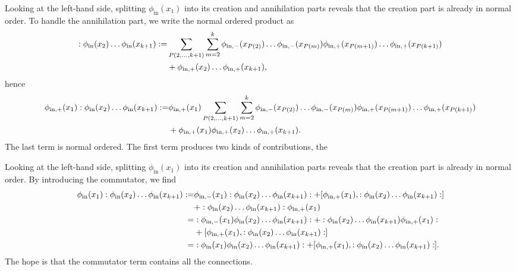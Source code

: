 Looking at the left-hand side, splitting $\phi_{\text{in}}(x_{1})$ into its creation and annihilation parts reveals that the creation part is already in normal order. To handle the annihilation part, we write the normal ordered product as
\begin{align*}
	:\phi_{\text{in}}(x_{2})\dots\phi_{\text{in}}(x_{k + 1}): =& \sum\limits_{P(2, \dots, k + 1)}\sum\limits_{m = 2}^{k}\phi_{\text{in}, -}(x_{P(2)})\dots\phi_{\text{in}, -}(x_{P(m)})\phi_{\text{in}, +}(x_{P(m + 1)})\dots\phi_{\text{in}, +}(x_{P(k + 1)}) \\
	                                                               &+ \phi_{\text{in}, +}(x_{2})\dots\phi_{\text{in}, +}(x_{k + 1}),
\end{align*}
hence
\begin{align*}
	\phi_{\text{in}, +}(x_{1}):\phi_{\text{in}}(x_{2})\dots\phi_{\text{in}}(x_{k + 1}): =& \phi_{\text{in}, +}(x_{1})\sum\limits_{P(2, \dots, k + 1)}\sum\limits_{m = 2}^{k}\phi_{\text{in}, -}(x_{P(2)})\dots\phi_{\text{in}, -}(x_{P(m)})\phi_{\text{in}, +}(x_{P(m + 1)})\dots\phi_{\text{in}, +}(x_{P(k + 1)}) \\
	&+ \phi_{\text{in}, +}(x_{1})\phi_{\text{in}, +}(x_{2})\dots\phi_{\text{in}, +}(x_{k + 1}).
\end{align*}
The last term is normal ordered. The first term produces two kinds of contributions, the 

Looking at the left-hand side, splitting $\phi_{\text{in}}(x_{1})$ into its creation and annihilation parts reveals that the creation part is already in normal order. By introducing the commutator, we find
\begin{align*}
	\phi_{\text{in}}(x_{1})\nop{\phi_{\text{in}}(x_{2})\dots\phi_{\text{in}}(x_{k + 1})} =& \phi_{\text{in}, -}(x_{1})\nop{\phi_{\text{in}}(x_{2})\dots\phi_{\text{in}}(x_{k + 1})} + \comm{\phi_{\text{in}, +}(x_{1})}{\nop{\phi_{\text{in}}(x_{2})\dots\phi_{\text{in}}(x_{k + 1})}} \\
	 &+ \nop{\phi_{\text{in}}(x_{2})\dots\phi_{\text{in}}(x_{k + 1})}\phi_{\text{in}, +}(x_{1}) \\
	=& \nop{\phi_{\text{in}, -}(x_{1})\phi_{\text{in}}(x_{2})\dots\phi_{\text{in}}(x_{k + 1})} + \nop{\phi_{\text{in}}(x_{2})\dots\phi_{\text{in}}(x_{k + 1})\phi_{\text{in}, +}(x_{1})} \\
	 &+ \comm{\phi_{\text{in}, +}(x_{1})}{\nop{\phi_{\text{in}}(x_{2})\dots\phi_{\text{in}}(x_{k + 1})}} \\
	=& \nop{\phi_{\text{in}}(x_{1})\phi_{\text{in}}(x_{2})\dots\phi_{\text{in}}(x_{k + 1})} + \comm{\phi_{\text{in}, +}(x_{1})}{\nop{\phi_{\text{in}}(x_{2})\dots\phi_{\text{in}}(x_{k + 1})}}.
\end{align*}
The hope is that the commutator term contains all the connections.

